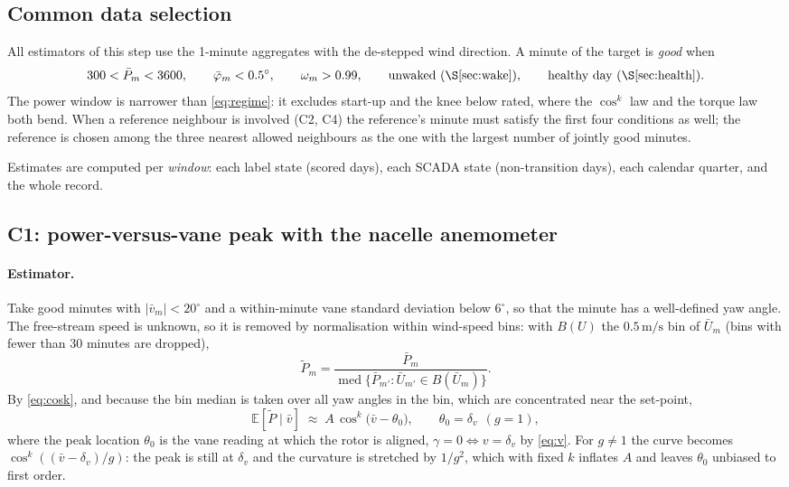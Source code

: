 \documentclass[11pt,a4paper]{article}
\theoremstyle{remark}
\newcommand{\med}{\operatorname{med}}
\newcommand{\E}{\mathbb{E}}
\newcommand{\dg}{^{\circ}}
\begin{document}
\subsection{Common data selection}\label{sec:good}
All estimators of this step use the 1-minute aggregates with the de-stepped
wind direction. A minute of the target is \emph{good} when
\begin{equation}
  300 < \bar P_m < 3600,\qquad \bar\varphi_m < 0.5\dg,\qquad \omega_m > 0.99,\qquad
  \text{unwaked (\S\ref{sec:wake})},\qquad \text{healthy day (\S\ref{sec:health})}.
  \label{eq:good}
\end{equation}
The power window is narrower than \eqref{eq:regime}: it excludes start-up and
the knee below rated, where the $\cos^k$ law and the torque law both bend. When
a reference neighbour is involved (C2, C4) the reference's minute must satisfy
the first four conditions as well; the reference is chosen among the three
nearest allowed neighbours as the one with the largest number of jointly good
minutes.

Estimates are computed per \emph{window}: each label state (scored days), each
SCADA state (non-transition days), each calendar quarter, and the whole record.

\subsection{C1: power-versus-vane peak with the nacelle anemometer}\label{sec:c1}

\paragraph{Estimator.} Take good minutes with $|\bar v_m|<20\dg$ and a
within-minute vane standard deviation below $6\dg$, so that the minute has a
well-defined yaw angle. The free-stream speed is unknown, so it is removed by
normalisation within wind-speed bins: with $B(U)$ the $0.5\,\mathrm{m/s}$ bin of
$\bar U_m$ (bins with fewer than $30$ minutes are dropped),
\begin{equation}
  \tilde P_m = \frac{\bar P_m}{\med\{\bar P_{m'} : \bar U_{m'} \in B(\bar U_m)\}} .
  \label{eq:norm}
\end{equation}
By \eqref{eq:cosk}, and because the bin median is taken over all yaw angles in
the bin, which are concentrated near the set-point,
\begin{equation}
  \E[\tilde P \mid \bar v] \;\approx\; A\,\cos^k\!\big(\bar v - \theta_0\big),
  \qquad \theta_0 = \delta_v \ \ (g=1),
  \label{eq:c1_model}
\end{equation}
where the peak location $\theta_0$ is the vane reading at which the rotor is
aligned, $\gamma=0\Leftrightarrow v=\delta_v$ by \eqref{eq:v}. For $g\ne1$ the
curve becomes $\cos^k((\bar v-\delta_v)/g)$: the peak is still at $\delta_v$ and
the curvature is stretched by $1/g^2$, which with fixed $k$ inflates $A$ and
leaves $\theta_0$ unbiased to first order.
\end{document}
